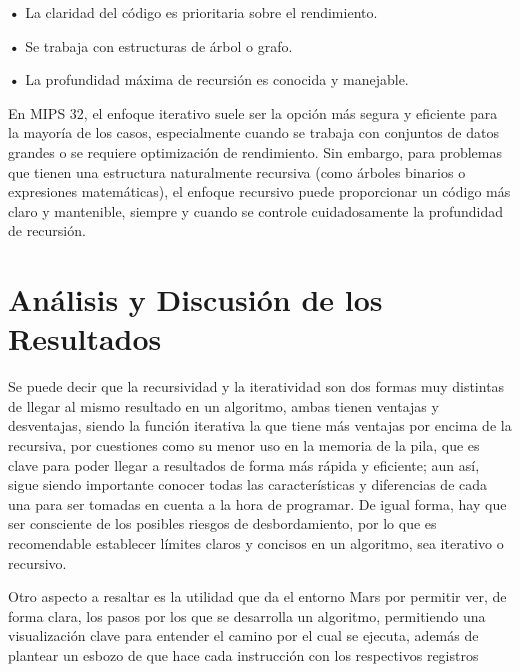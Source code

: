 \documentclass{article}
\begin{document}
\textbf{    •} { La claridad del código es prioritaria sobre el rendimiento.}

\textbf{    •} { Se trabaja con estructuras de árbol o grafo.}

\textbf{    •} { La profundidad máxima de recursión es conocida y manejable.}

\quad

{En MIPS 32, el enfoque iterativo suele ser la opción más segura y eficiente para la mayoría de los casos, especialmente cuando se trabaja con conjuntos de datos grandes o se requiere optimización de rendimiento. Sin embargo, para problemas que tienen una estructura naturalmente recursiva (como árboles binarios o expresiones matemáticas), el enfoque recursivo puede proporcionar un código más claro y mantenible, siempre y cuando se controle cuidadosamente la profundidad de recursión.}


\quad
\newpage

\section{Análisis y Discusión de los Resultados}

\quad

{Se puede decir que la recursividad y la iteratividad son dos formas muy distintas de llegar al mismo resultado en un algoritmo, ambas tienen ventajas y desventajas, siendo la función iterativa la que tiene más ventajas por encima de la recursiva, por cuestiones como su menor uso en la memoria de la pila, que es clave para poder llegar a resultados de forma más rápida y eficiente; aun así, sigue siendo importante conocer todas las características y diferencias de cada una para ser tomadas en cuenta a la hora de programar. De igual forma, hay que ser consciente de los posibles riesgos de desbordamiento, por lo que es recomendable establecer límites claros y concisos en un algoritmo, sea iterativo o recursivo.}

\quad

{Otro aspecto a resaltar es la utilidad que da el entorno Mars por permitir ver, de forma clara, los pasos por los que se desarrolla un algoritmo, permitiendo una visualización clave para entender el camino por el cual se ejecuta, además de plantear un esbozo de que hace cada instrucción con los respectivos registros}
\end{document}
